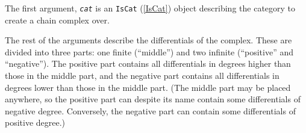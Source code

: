 \documentclass[a4paper,11pt]{report}
\begin{document}
{{{ The first argument, \mbox{\texttt{\mdseries\slshape cat}} is an \texttt{IsCat} (\ref{IsCat}) object describing the category to create a chain complex over.

 The rest of the arguments describe the differentials of the complex. These are
divided into three parts: one finite (``middle'') and two infinite (``positive'' and ``negative''). The positive part contains all differentials in degrees higher than those
in the middle part, and the negative part contains all differentials in
degrees lower than those in the middle part. (The middle part may be placed
anywhere, so the positive part can \texttt{}\texttt{}
despite its name \texttt{}\texttt{} contain some
differentials of negative degree. Conversely, the negative part can contain
some differentials of positive degree.)

}}}
\end{document}
